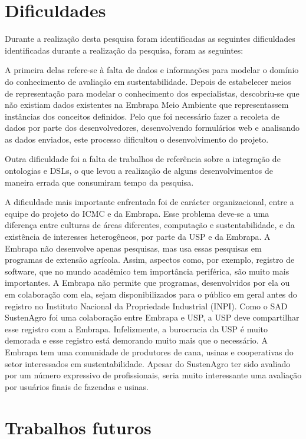 \section{Dificuldades }

Durante a realização desta pesquisa foram identificadas as seguintes
dificuldades identificadas durante a realização da pesquisa, foram
as seguintes:

A primeira delas refere-se à falta de dados e informações para modelar
o domínio do conhecimento de avaliação em sustentabilidade. Depois
de estabelecer meios de representação para modelar o conhecimento
dos especialistas, descobriu-se que não existiam dados existentes
na Embrapa Meio Ambiente que representassem instâncias dos conceitos
definidos. Pelo que foi necessário fazer a recoleta de dados por parte
dos desenvolvedores, desenvolvendo formulários web e analisando as
dados enviados, este processo dificultou o desenvolvimento do projeto.

Outra dificuldade foi a falta de trabalhos de referência sobre a integração
de ontologias e DSLs, o que levou a realização de alguns desenvolvimentos
de maneira errada que consumiram tempo da pesquisa. 

A dificuldade mais importante enfrentada foi de carácter organizacional,
entre a equipe do projeto do ICMC e da Embrapa. Esse problema deve-se
a uma diferença entre culturas de áreas diferentes, computação e sustentabilidade,
e da existência de interesses heterogêneos, por parte da USP e da
Embrapa. A Embrapa não desenvolve apenas pesquisas, mas usa essas
pesquisas em programas de extensão agrícola. Assim, aspectos como,
por exemplo, registro de software, que no mundo acadêmico tem importância
periférica, são muito mais importantes. A Embrapa não permite que
programas, desenvolvidos por ela ou em colaboração com ela, sejam
disponibilizados para o público em geral antes do registro no Instituto
Nacional da Propriedade Industrial (INPI). Como o SAD SustenAgro foi
uma colaboração entre Embrapa e USP, a USP deve compartilhar esse
registro com a Embrapa. Infelizmente, a burocracia da USP é muito
demorada e esse registro está demorando muito mais que o necessário.
A Embrapa tem uma comunidade de produtores de cana, usinas e cooperativas
do setor interessados em sustentabilidade. Apesar do SustenAgro ter
sido avaliado por um número expressivo de profissionais, seria muito
interessante uma avaliação por usuários finais de fazendas e usinas.

\section{Trabalhos futuros}

